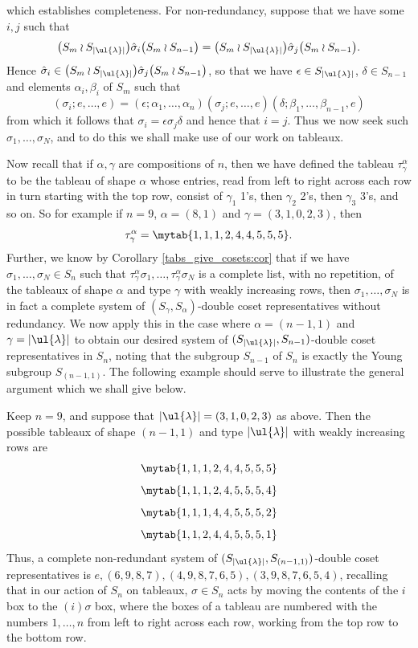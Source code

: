 which establishes completeness. For non-redundancy, suppose that we have some $i,j$ such that
\[ \bigl(S_m \wr S_{|\ul{\lambda}|}\bigr) \hat\sigma_i  \bigl(S_m \wr S_{n-1}\bigr) =
\bigl(S_m \wr S_{|\ul{\lambda}|}\bigr) \hat\sigma_j  \bigl(S_m \wr S_{n-1}\bigr). \]
Hence $\hat\sigma_i \in \bigl(S_m \wr S_{|\ul{\lambda}|}\bigr) \hat\sigma_j  \bigl(S_m \wr S_{n-1}\bigr)$, so that
we have $\epsilon \in S_{|\ul{\lambda}|}$, $\delta \in S_{n-1}$ and elements $\alpha_i,\beta_i$ of $S_m$ such that
\[
(\sigma_i;e,\ldots,e) =
(\epsilon;\alpha_1,\ldots,\alpha_n)
(\sigma_j;e,\ldots,e)
(\delta;\beta_1,\ldots,\beta_{n-1},e)
\]
from which it follows that $\sigma_i = \epsilon\sigma_j\delta$ and hence that $i=j$. Thus we now seek such $\sigma_1,\ldots,\sigma_N$,
and to do this we shall make use of our work on tableaux.

Now recall that if $\alpha,\gamma$ are compositions of $n$, then we have defined the tableau $\tau^\alpha_\gamma$ to be the tableau of shape
$\alpha$ whose entries, read from left to right across each row in turn starting with the top row, consist of $\gamma_1$ 1's, then
$\gamma_2$ 2's, then $\gamma_3$ 3's, and so on. So for example if $n=9$, $\alpha = (8,1)$ and $\gamma = (3,1,0,2,3)$, then
\[\tau^\alpha_\gamma = \mytab{
{{1,1,1,2,4,4,5,5},{5}}
}.\]
Further, we know by Corollary \ref{tabs_give_cosets:cor} that if we have $\sigma_1,\ldots,\sigma_N \in S_n$ such that
$\tau^\alpha_\gamma\sigma_1,\ldots,\tau^\alpha_\gamma\sigma_N$ is a complete list, with no repetition, of the tableaux of shape $\alpha$ and
type $\gamma$ with weakly increasing rows, then $\sigma_1,\ldots,\sigma_N$ is in fact a complete system of $(S_\gamma,S_\alpha)$-double
coset representatives without redundancy. We now apply this in the case where $\alpha = (n-1,1)$ and $\gamma = |\ul{\lambda}|$ to obtain
our desired system of $(S_{|\ul{\lambda}|},S_{n-1})$-double coset representatives in $S_n$, noting that the subgroup $S_{n-1}$ of $S_n$ is
exactly the Young subgroup $S_{(n-1,1)}$. The following example should serve to illustrate the general argument which we shall give below.

Keep $n=9$, and suppose that $|\ul{\lambda}| = (3,1,0,2,3)$ as above. Then the possible tableaux of shape $(n-1,1)$ and type
$|\ul{\lambda}|$ with weakly increasing rows are
\[
\mytab{
{{1,1,1,2,4,4,5,5},{5}}
}\]\[
\mytab{
{{1,1,1,2,4,5,5,5},{4}}
}\]\[
\mytab{
{{1,1,1,4,4,5,5,5},{2}}
}\]\[
\mytab{
{{1,1,2,4,4,5,5,5},{1}}
}
\]
Thus, a complete non-redundant system of $(S_{|\ul{\lambda}|},S_{(n-1,1)})$-double coset representatives is
$e,(6,9,8,7),(4,9,8,7,6,5),(3,9,8,7,6,5,4)$, recalling that in our action of $S_n$ on tableaux, $\sigma \in S_n$ acts by moving the
contents of the $i$ box to the $(i)\sigma$ box, where the boxes of a tableau are numbered with the numbers $1,\ldots,n$
from left to right across each row, working from the top row to the bottom row.

